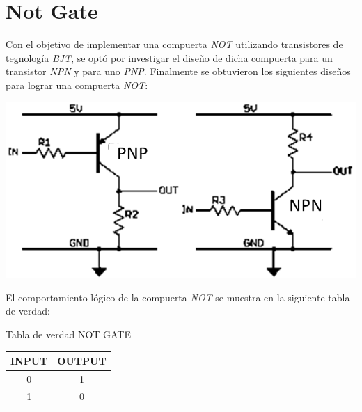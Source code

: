 \chapter{Not Gate}

Con el objetivo de implementar una compuerta \emph{NOT} utilizando transistores de tegnología \emph{BJT}, se optó por investigar el diseño de dicha compuerta para un transistor \emph{NPN} y para uno \emph{PNP}.
Finalmente se obtuvieron los siguientes diseños para lograr una compuerta \emph{NOT}:

\begin{center}
\includegraphics[scale=1]{../1-NotGate/circuitos.png}
\end{center}

El comportamiento lógico de la compuerta \emph{NOT} se muestra en la siguiente tabla de verdad:
\begin{center}
Tabla de verdad NOT GATE
	\begin{center}
		\begin{tabular}{|c|c|}
					\hline
					\textbf{INPUT} & \textbf{OUTPUT} \\
					\hline
					0  &  1\\
					\hline
					1  & 0\\
					\hline
				\end{tabular}
	\end{center}
\end{center}

